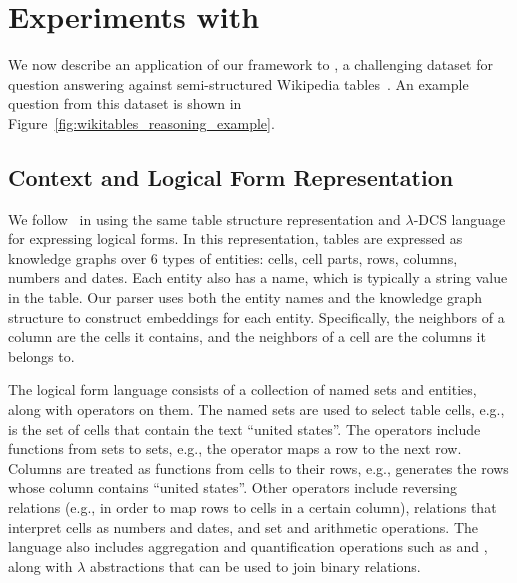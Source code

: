 \section{Experiments with \WTQ{}}
We now describe an application of our framework to \WTQ{}, 
a challenging dataset for question
answering against semi-structured Wikipedia
tables~\citep{pasupat2015compositional}. An example question from this dataset
is shown in Figure~\ref{fig:wikitables_reasoning_example}.

\subsection{Context and Logical Form Representation}\label{sec:preliminaries}

We follow~\citep{pasupat2015compositional} in using the same table structure 
representation 
and $\lambda$-DCS language for expressing logical forms.
In this representation, tables are expressed as knowledge graphs over 6 types 
of 
entities: cells, cell parts, rows, columns, numbers and dates.
Each entity also has a name, which is typically a string value in the table.
Our parser uses both the entity names and the knowledge graph structure to 
construct embeddings for each entity. Specifically, the neighbors of a column 
are the cells it
contains, and the neighbors of a cell are the columns it belongs to.

The logical form language consists of a collection of named sets and entities, 
along with operators on them.
The named sets are used to select table cells, e.g.,  is 
the set of cells that contain the text ``united states''.
The operators include functions from sets to sets, e.g., the  
operator maps a row to the next row.
Columns are treated as functions from cells to their rows, e.g.,  generates the rows whose  column contains 
``united states''. 
Other operators include reversing relations (e.g., in order to map rows to 
cells 
in a certain column), relations that interpret cells as numbers and dates, and 
set and arithmetic operations. 
The language also includes aggregation and quantification operations such as 
 and , along with $\lambda$ abstractions that can be 
used to join binary relations.

